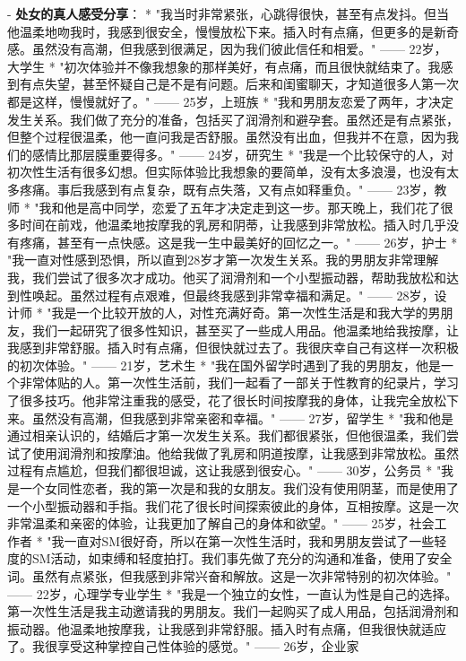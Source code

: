 \begin{enumerate}
  - \textbf{处女的真人感受分享}：
    * "我当时非常紧张，心跳得很快，甚至有点发抖。但当他温柔地吻我时，我感到很安全，慢慢放松下来。插入时有点痛，但更多的是新奇感。虽然没有高潮，但我感到很满足，因为我们彼此信任和相爱。" —— 22岁，大学生
    * "初次体验并不像我想象的那样美好，有点痛，而且很快就结束了。我感到有点失望，甚至怀疑自己是不是有问题。后来和闺蜜聊天，才知道很多人第一次都是这样，慢慢就好了。" —— 25岁，上班族
    * "我和男朋友恋爱了两年，才决定发生关系。我们做了充分的准备，包括买了润滑剂和避孕套。虽然还是有点紧张，但整个过程很温柔，他一直问我是否舒服。虽然没有出血，但我并不在意，因为我们的感情比那层膜重要得多。" —— 24岁，研究生
    * "我是一个比较保守的人，对初次性生活有很多幻想。但实际体验比我想象的要简单，没有太多浪漫，也没有太多疼痛。事后我感到有点复杂，既有点失落，又有点如释重负。" —— 23岁，教师
    * "我和他是高中同学，恋爱了五年才决定走到这一步。那天晚上，我们花了很多时间在前戏，他温柔地按摩我的乳房和阴蒂，让我感到非常放松。插入时几乎没有疼痛，甚至有一点快感。这是我一生中最美好的回忆之一。" —— 26岁，护士
    * "我一直对性感到恐惧，所以直到28岁才第一次发生关系。我的男朋友非常理解我，我们尝试了很多次才成功。他买了润滑剂和一个小型振动器，帮助我放松和达到性唤起。虽然过程有点艰难，但最终我感到非常幸福和满足。" —— 28岁，设计师
    * "我是一个比较开放的人，对性充满好奇。第一次性生活是和我大学的男朋友，我们一起研究了很多性知识，甚至买了一些成人用品。他温柔地给我按摩，让我感到非常舒服。插入时有点痛，但很快就过去了。我很庆幸自己有这样一次积极的初次体验。" —— 21岁，艺术生
    * "我在国外留学时遇到了我的男朋友，他是一个非常体贴的人。第一次性生活前，我们一起看了一部关于性教育的纪录片，学习了很多技巧。他非常注重我的感受，花了很长时间按摩我的身体，让我完全放松下来。虽然没有高潮，但我感到非常亲密和幸福。" —— 27岁，留学生
    * "我和他是通过相亲认识的，结婚后才第一次发生关系。我们都很紧张，但他很温柔，我们尝试了使用润滑剂和按摩油。他给我做了乳房和阴道按摩，让我感到非常放松。虽然过程有点尴尬，但我们都很坦诚，这让我感到很安心。" —— 30岁，公务员
    * "我是一个女同性恋者，我的第一次是和我的女朋友。我们没有使用阴茎，而是使用了一个小型振动器和手指。我们花了很长时间探索彼此的身体，互相按摩。这是一次非常温柔和亲密的体验，让我更加了解自己的身体和欲望。" —— 25岁，社会工作者
    * "我一直对SM很好奇，所以在第一次性生活时，我和男朋友尝试了一些轻度的SM活动，如束缚和轻度拍打。我们事先做了充分的沟通和准备，使用了安全词。虽然有点紧张，但我感到非常兴奋和解放。这是一次非常特别的初次体验。" —— 22岁，心理学专业学生
    * "我是一个独立的女性，一直认为性是自己的选择。第一次性生活是我主动邀请我的男朋友。我们一起购买了成人用品，包括润滑剂和振动器。他温柔地按摩我，让我感到非常舒服。插入时有点痛，但我很快就适应了。我很享受这种掌控自己性体验的感觉。" —— 26岁，企业家


\end{enumerate}
